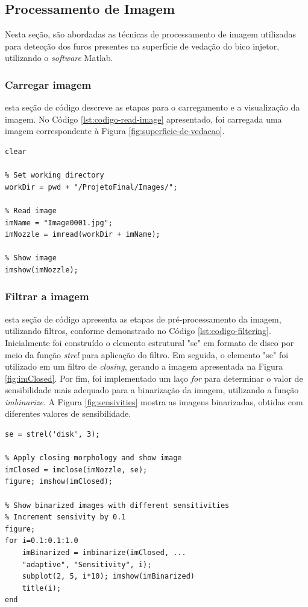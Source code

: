 \documentclass[conference]{IEEEtran}
\begin{document}
\subsection{Processamento de Imagem}

Nesta seção, são abordadas as técnicas de processamento de imagem utilizadas para detecção dos furos presentes na superfície de vedação do bico injetor, utilizando o \textit{software} Matlab.  

\subsubsection{Carregar imagem} esta seção de código descreve as etapas para o carregamento e a visualização da imagem. No Código \ref{lst:codigo-read-image} apresentado, foi carregada uma imagem correspondente à Figura \ref{fig:superficie-de-vedacao}. 

\begin{lstlisting}[caption={Carregamento e visualização da imagem}, label={lst:codigo-read-image}]
% Clear workspace
clear

% Set working directory
workDir = pwd + "/ProjetoFinal/Images/";

% Read image
imName = "Image0001.jpg";
imNozzle = imread(workDir + imName);

% Show image
imshow(imNozzle);
\end{lstlisting}

\subsubsection{Filtrar a imagem} esta seção de código apresenta as etapas de pré-processamento da imagem, utilizando filtros, conforme demonstrado no Código \ref{lst:codigo-filtering}. Inicialmente foi construído o elemento estrutural "se" em formato de disco por meio da função \textit{strel} para aplicação do filtro. Em seguida, o elemento "se" foi utilizado em um filtro de \textit{closing}, gerando a imagem apresentada na Figura \ref{fig:imClosed}. Por fim, foi implementado um laço \textit{for} para determinar o valor de sensibilidade mais adequado para a binarização da imagem, utilizando a função \textit{imbinarize}. A Figura \ref{fig:sensivities} mostra as imagens binarizadas, obtidas com diferentes valores de sensibilidade.

\begin{lstlisting}[caption={Filtragem e análise da sensibilidade para binarização}, label={lst:codigo-filtering}]
% Create structuring element
se = strel('disk', 3);

% Apply closing morphology and show image
imClosed = imclose(imNozzle, se);
figure; imshow(imClosed);

% Show binarized images with different sensitivities
% Increment sensivity by 0.1
figure;
for i=0.1:0.1:1.0
	imBinarized = imbinarize(imClosed, ...
	"adaptive", "Sensitivity", i); 
	subplot(2, 5, i*10); imshow(imBinarized)
	title(i);
end
\end{lstlisting}
\end{document}
